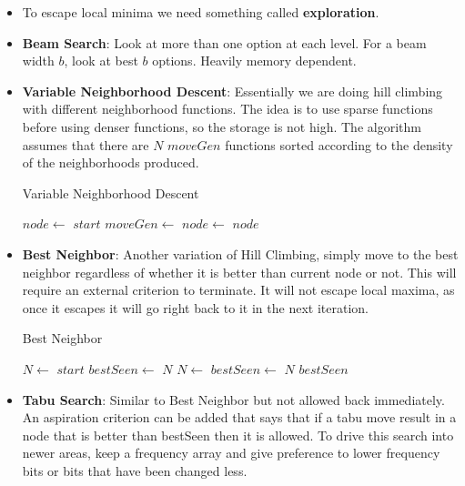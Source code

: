 \documentclass[a4paper]{article}
\begin{document}
\begin{itemize}
    \item To escape local minima we need something called \textbf{exploration}.
    \item \textbf{Beam Search}: Look at more than one option at each level. For a beam width $b$, look at best $b$ options. Heavily memory dependent.
    \item \textbf{Variable Neighborhood Descent}: Essentially we are doing hill climbing with different neighborhood functions. The idea is to use sparse functions before using denser functions, so the storage is not high. The algorithm assumes that there are $N$ $moveGen$ functions sorted according to the density of the neighborhoods produced.
    \begin{algorithm}[H]
        \caption{Variable Neighborhood Descent}\label{alg:Variable-Neighborhood-Descent}
        \begin{algorithmic}[1]
            \Statex {}
            \State $node\gets$ $start$
                \State $moveGen\gets$ 
                \State $node\gets$ 
            \EndFor
            \State \Return $node$
        \end{algorithmic}
    \end{algorithm}
    \item \textbf{Best Neighbor}: Another variation of Hill Climbing, simply move to the best neighbor regardless of whether it is better than current node or not. This will require an external criterion to terminate. It will not escape local maxima, as once it escapes it will go right back to it in the next iteration.
    \begin{algorithm}[H]
        \caption{Best Neighbor}\label{alg:best-neighbor}
        \begin{algorithmic}[1]
            \Statex {}
            \State $N\gets$ $start$
            \State $bestSeen\gets$ $N$
                \State $N\gets$ 
                    \State $bestSeen\gets$ $N$
                \EndIf
            \EndWhile
            \State \Return $bestSeen$
        \end{algorithmic}
    \end{algorithm}
    \item \textbf{Tabu Search}: Similar to Best Neighbor but not allowed back immediately. An aspiration criterion can be added that says that if a tabu move result in a node that is better than bestSeen then it is allowed. To drive this search into newer areas, keep a frequency array and give preference to lower frequency bits or bits that have been changed less.

\end{itemize}
\end{document}
